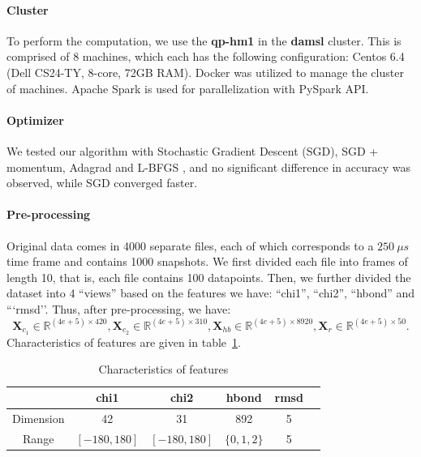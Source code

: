 \documentclass{article}
\newcommand{\mat}[1]{\mathbf{#1}}
\begin{document}
\paragraph{Cluster} To perform the computation, we use the \textbf{qp-hm1} in the \textbf{damsl} cluster. This is comprised of 8 machines,  which each has the following configuration: Centos 6.4 (Dell CS24-TY, 8-core, 72GB RAM). Docker was utilized to manage the cluster of machines. Apache Spark is used for parallelization with PySpark API.

\paragraph{Optimizer} We tested our algorithm with Stochastic Gradient Descent (SGD), SGD + momentum, Adagrad and L-BFGS \cite{avriel2003nonlinear}, and no significant difference in accuracy was observed, while SGD converged faster. 

\paragraph{Pre-processing} Original data comes in 4000 separate files, each of which corresponds to a $250 \ \mu s$ time frame and contains 1000 snapshots. We first divided each file into frames of length 10, that is, each file contains 100 datapoints. Then, we further divided the dataset into 4 ``views'' based on the features we have: ``chi1'', ``chi2'', ``hbond'' and ```rmsd''. Thus, after pre-processing, we have: $$ \mat{X}_{c_1} \in \mathbb{R}^{({4e+5}) \times 420},   \mat{X}_{c_2} \in \mathbb{R}^{({4e+5}) \times 310},   \mat{X}_{hb} \in \mathbb{R}^{({4e+5}) \times 8920},   \mat{X}_{r} \in \mathbb{R}^{({4e+5}) \times 50}.$$ Characteristics of features are given in table~\ref{tab:features}.

\begin{table}
\begin{center}
\begin{tabular}{|c|c|c|c|c|c|}
\hline
 & chi1 & chi2 & hbond & rmsd \\
\hline\hline
Dimension & 42 & 31 & 892 & 5\\
\hline
Range & $[-180 , 180]$ & $[-180 , 180]$ & $\{ 0,1,2 \}$ & 5\\
\hline
\end{tabular}
\caption{Characteristics of features \label{tab:features}}
\end{center}
\end{table}
\end{document}
